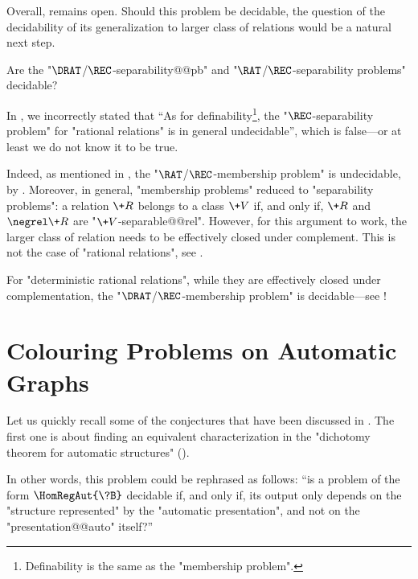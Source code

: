 Overall,  remains open.
Should this problem be decidable, the question of
the decidability of its generalization to larger class of relations would be
a natural next step.

\begin{openproblem}
	Are the "$\DRAT$/$\REC$-separability@@pb" and
	"$\RAT$/$\REC$-separability problems" decidable?
\end{openproblem}

In \cite[\S~1]{BarceloFigueiraMorvan2023SeparatingAutomatic},
we incorrectly stated that ``As for definability\footnote{Definability is the same
as the "membership problem".}, the "$\REC$-separability problem" for "rational relations" is in general undecidable'', which is false---or at least we do not know it to be true.

Indeed, as mentioned in ,
the "$\RAT$/$\REC$-membership problem" is undecidable, by
\cite[\S~III, Theorem~8.4]{Berstel1979Transductions}.
Moreover, in general, "membership problems" reduced to "separability problems":
a relation $\+R$ belongs to a class $\+V$ if, and only if, $\+R$ and $\negrel \+R$
are "$\+V$-separable@@rel". However, for this argument to work, the larger class of relation
needs to be effectively closed under complement.
This is not the case of "rational relations", see .

For "deterministic rational relations", while they are effectively
closed under complementation, the "$\DRAT$/$\REC$-membership problem"
is decidable---see !

\section{Colouring Problems on Automatic Graphs}

Let us quickly recall some of the conjectures that have been discussed in .
The first one is about finding an equivalent characterization in the "dichotomy theorem
for automatic structures" ().

\conjInvarianceGraphIsomorphisms*

In other words, this problem could be rephrased as follows: ``is a problem
of the form $\HomRegAut{\?B}$ decidable if, and only if, its output
only depends on the "structure represented" by the "automatic presentation",
and not on the "presentation@@auto" itself?''

